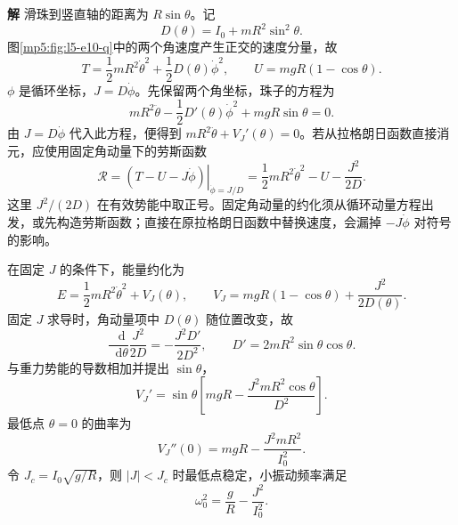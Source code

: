 \documentclass[11pt,openany,fontset=fandol]{ctexbook}
\theoremstyle{definition}\newtheorem{example}{例}[chapter]\newtheorem{exercise}{习题}[chapter]
\newcommand{\SolutionStart}{\par\medskip\ifdim\pagetotal>0pt\ifdim\dimexpr\pagegoal-\pagetotal\relax<3\baselineskip\newpage\fi\fi\noindent\textbf{解}\quad\ignorespaces}
\newenvironment{solution}{\SolutionStart}{\par\medskip}
\newcommand{\dd}{\mathop{}\!\mathrm d}\newcommand{\ee}{\mathrm e}\newcommand{\vct}[1]{\bm{#1}}
\begin{document}
\begin{solution}
滑珠到竖直轴的距离为 $R\sin\theta$。记
\[
D(\theta)=I_0+mR^2\sin^2\theta.
\]
图\ref{mp5:fig:l5-e10-q}中的两个角速度产生正交的速度分量，故
\[
T=\frac12mR^2\dot\theta^2+\frac12D(\theta)\dot\phi^2,
\qquad U=mgR(1-\cos\theta).
\]
$\phi$ 是循环坐标，$J=D\dot\phi$。先保留两个角坐标，珠子的方程为
\[
mR^2\ddot\theta-\frac12D'(\theta)\dot\phi^2+mgR\sin\theta=0.
\]
由 $J=D\dot\phi$ 代入此方程，便得到 $mR^2\ddot\theta+V_J'(\theta)=0$。若从拉格朗日函数直接消元，应使用固定角动量下的劳斯函数
\[
\mathcal R=\left.(T-U-J\dot\phi)\right|_{\dot\phi=J/D}
=\frac12mR^2\dot\theta^2-U-\frac{J^2}{2D}.
\]
这里 $J^2/(2D)$ 在有效势能中取正号。固定角动量的约化须从循环动量方程出发，或先构造劳斯函数；直接在原拉格朗日函数中替换速度，会漏掉 $-J\dot\phi$ 对符号的影响。

在固定 $J$ 的条件下，能量约化为
\[
E=\frac12mR^2\dot\theta^2+V_J(\theta),\qquad
\boxed{V_J=mgR(1-\cos\theta)+\frac{J^2}{2D(\theta)}.}
\]
固定 $J$ 求导时，角动量项中 $D(\theta)$ 随位置改变，故
\[
\frac{\dd}{\dd\theta}\frac{J^2}{2D}
=-\frac{J^2D'}{2D^2},\qquad
D'=2mR^2\sin\theta\cos\theta.
\]
与重力势能的导数相加并提出 $\sin\theta$，
\[
V_J'=\sin\theta\left[mgR-
\frac{J^2mR^2\cos\theta}{D^2}\right].
\]
最低点 $\theta=0$ 的曲率为
\[
V_J''(0)=mgR-\frac{J^2mR^2}{I_0^2}.
\]
令 $J_c=I_0\sqrt{g/R}$，则 $|J|<J_c$ 时最低点稳定，小振动频率满足
\[
\omega_0^2=\frac gR-\frac{J^2}{I_0^2}.
\]


\end{solution}
\end{document}

